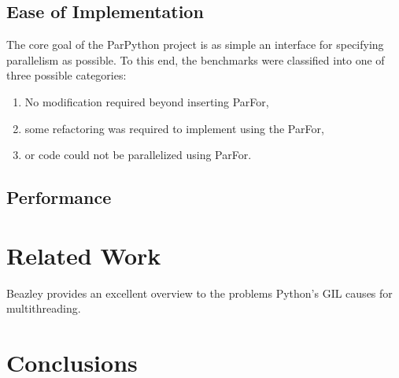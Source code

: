 \documentclass[conference]{IEEEtran}
\begin{document}
\subsection{Ease of Implementation}

The core goal of the ParPython project is as simple an interface for specifying parallelism as possible. To this end, 
the benchmarks were classified into one of three possible categories:
\begin{enumerate}
   \item No modification required beyond inserting ParFor,
   \item some refactoring was required to implement using the ParFor,
   \item or code could not be parallelized using ParFor.
\end{enumerate}




\subsection{Performance}






\section{Related Work}

Beazley \cite{beazley2010understanding} provides an excellent overview to the problems Python's GIL causes for multithreading.

\section{Conclusions}




\end{document}
